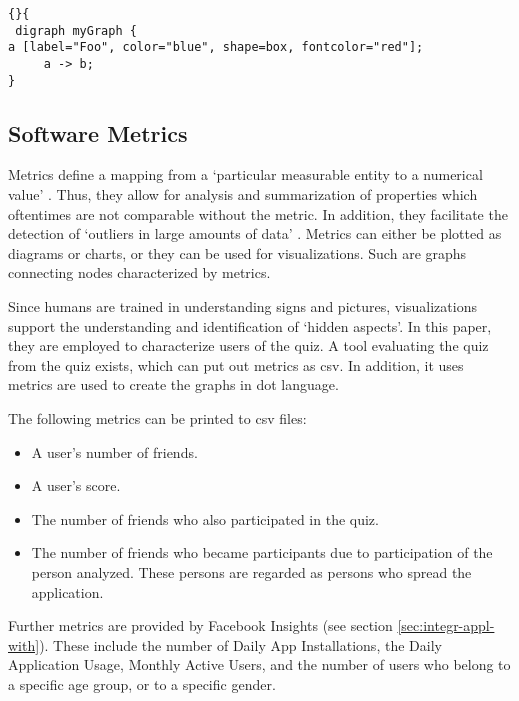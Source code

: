 \documentclass[preprint,12pt]{elsarticle}
\begin{document}
\begin{lstlisting}[caption=A very simple DOT-Graph,
  label=list:dot2]{}{
 digraph myGraph {
a [label="Foo", color="blue", shape=box, fontcolor="red"];
     a -> b;
}
\end{lstlisting}

\subsection{Software Metrics}
\label{sec:metrics}
Metrics define a mapping from a `particular measurable entity to a
numerical value' \cite{Lanz06a}. Thus, they allow for analysis and summarization
of properties which oftentimes are not comparable without the metric. In addition, they
facilitate the detection of `outliers in large amounts of data'
\cite{Lanz06a}. Metrics can either be plotted as diagrams or charts, or they
can be used for visualizations. Such are graphs connecting nodes
characterized by metrics. 

Since humans are trained in understanding signs and
pictures, visualizations support the understanding and identification of
`hidden aspects'.\cite{Lanz06a} In this paper, they are
employed to characterize users of the quiz. A tool evaluating the quiz
from the quiz exists, which can put out metrics
as \ac{csv}. In addition, it uses metrics are used to create the graphs in \ac{dot} language.

The following metrics can be printed to \ac{csv} files:

\begin{itemize}
\item A user's number of friends.
\item A user's score.
\item The number of friends who also participated in the quiz.
\item The number of friends who became participants due to
participation of the person analyzed. These persons are regarded as
persons who spread the application.
\end{itemize}

Further metrics are provided by Facebook Insights (see section
\ref{sec:integr-appl-with}). These include the number of Daily
App Installations, the Daily Application Usage, Monthly Active Users,
and the number of users who belong to a specific age group, or to a
specific gender.
\end{document}
